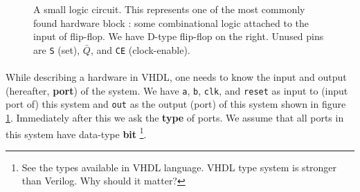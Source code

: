 \documentclass[a4paper,10pt]{article}
\begin{document}
  \begin{figure}[h] 
    \begin{center}  \end{center}

    \caption{A small logic circuit. This represents one of the most commonly
    found hardware block : some combinational logic attached to the input of
    flip-flop.  We have D-type flip-flop on the right. Unused pins are
    \texttt{S} (set), $\bar{Q}$, and \texttt{CE} (clock-enable).}
 
    \label{fig:circuit}
 
  \end{figure}

\paragraph{}

  While describing a hardware in VHDL, one needs to know the input and output
  (hereafter, \textbf{port}) of the system. We have \texttt{a}, \texttt{b},
  \texttt{clk}, and \texttt{reset} as input to (input port of) this system and
  \texttt{out} as the output (port) of this system shown in figure
  \ref{fig:circuit}. Immediately after this we ask the \textbf{type} of ports.
  We assume that all ports in this system have data-type \textbf{bit}
  \footnote{See the types available in VHDL language. VHDL type system is
  stronger than Verilog. Why should it matter?}.
\end{document}
